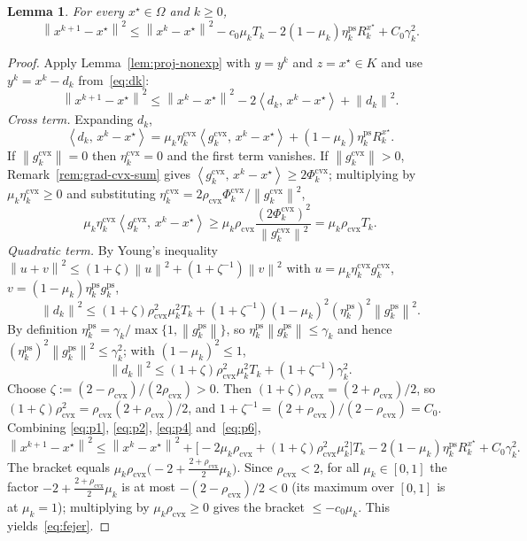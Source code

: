 \documentclass[]{interact}
\theoremstyle{plain}
\newtheorem{lemma}[theorem]{Lemma}
\theoremstyle{definition}
\theoremstyle{remark}
\newcommand{\norm}[1]{\left\lVert #1 \right\rVert}
\newcommand{\inner}[2]{\left\langle #1,\, #2 \right\rangle}
\newcommand{\cvx}{\mathrm{cvx}}
\newcommand{\ps}{\mathrm{ps}}
\begin{document}
\begin{lemma}\label{lem:fejer}
For every $x^\star\in\Omega$ and $k\ge 0$,
\begin{equation}\label{eq:fejer}
\norm{x^{k+1}-x^\star}^2\le\norm{x^k-x^\star}^2-c_0\mu_k T_k-2(1-\mu_k)\eta^{\ps}_k R^{x^\star}_k+C_0\gamma_k^2 .
\end{equation}
\end{lemma}
\begin{proof}
Apply Lemma~\ref{lem:proj-nonexp} with $y=y^k$ and $z=x^\star\in K$ and use
$y^k=x^k-d_k$ from~\eqref{eq:dk}:
\begin{equation}\label{eq:p1}
\norm{x^{k+1}-x^\star}^2\le\norm{x^k-x^\star}^2-2\inner{d_k}{x^k-x^\star}+\norm{d_k}^2 .
\end{equation}
\emph{Cross term.} Expanding $d_k$,
\begin{equation}\label{eq:p2}
\inner{d_k}{x^k-x^\star}=\mu_k\eta^{\cvx}_k\inner{g^{\cvx}_k}{x^k-x^\star}+(1-\mu_k)\eta^{\ps}_k R^{x^\star}_k .
\end{equation}
If $\norm{g^{\cvx}_k}=0$ then $\eta^{\cvx}_k=0$ and the first term vanishes. If
$\norm{g^{\cvx}_k}>0$, Remark~\ref{rem:grad-cvx-sum} gives
$\inner{g^{\cvx}_k}{x^k-x^\star}\ge 2\Phi^{\cvx}_k$; multiplying by
$\mu_k\eta^{\cvx}_k\ge 0$ and substituting
$\eta^{\cvx}_k=2\rho_{\cvx}\Phi^{\cvx}_k/\norm{g^{\cvx}_k}^2$,
\begin{equation}\label{eq:p4}
\mu_k\eta^{\cvx}_k\inner{g^{\cvx}_k}{x^k-x^\star}\ge\mu_k\rho_{\cvx}\frac{(2\Phi^{\cvx}_k)^2}{\norm{g^{\cvx}_k}^2}=\mu_k\rho_{\cvx}T_k .
\end{equation}
\emph{Quadratic term.} By Young's inequality
$\norm{u+v}^2\le(1+\zeta)\norm{u}^2+(1+\zeta^{-1})\norm{v}^2$ with
$u=\mu_k\eta^{\cvx}_k g^{\cvx}_k$, $v=(1-\mu_k)\eta^{\ps}_k g^{\ps}_k$,
\[
\norm{d_k}^2\le(1+\zeta)\rho_{\cvx}^2\mu_k^2 T_k+(1+\zeta^{-1})(1-\mu_k)^2(\eta^{\ps}_k)^2\norm{g^{\ps}_k}^2 .
\]
By definition $\eta^{\ps}_k=\gamma_k/\max\{1,\norm{g^{\ps}_k}\}$, so
$\eta^{\ps}_k\norm{g^{\ps}_k}\le\gamma_k$ and hence
$(\eta^{\ps}_k)^2\norm{g^{\ps}_k}^2\le\gamma_k^2$; with $(1-\mu_k)^2\le 1$,
\begin{equation}\label{eq:p6}
\norm{d_k}^2\le(1+\zeta)\rho_{\cvx}^2\mu_k^2 T_k+(1+\zeta^{-1})\gamma_k^2 .
\end{equation}
Choose $\zeta:=(2-\rho_{\cvx})/(2\rho_{\cvx})>0$. Then
$(1+\zeta)\rho_{\cvx}=(2+\rho_{\cvx})/2$, so
$(1+\zeta)\rho_{\cvx}^2=\rho_{\cvx}(2+\rho_{\cvx})/2$, and
$1+\zeta^{-1}=(2+\rho_{\cvx})/(2-\rho_{\cvx})=C_0$. Combining
\eqref{eq:p1}, \eqref{eq:p2}, \eqref{eq:p4} and~\eqref{eq:p6},
\[
\norm{x^{k+1}-x^\star}^2\le\norm{x^k-x^\star}^2+\bigl[-2\mu_k\rho_{\cvx}+(1+\zeta)\rho_{\cvx}^2\mu_k^2\bigr]T_k-2(1-\mu_k)\eta^{\ps}_k R^{x^\star}_k+C_0\gamma_k^2 .
\]
The bracket equals
$\mu_k\rho_{\cvx}\bigl(-2+\tfrac{2+\rho_{\cvx}}{2}\mu_k\bigr)$. Since $\rho_{\cvx}<2$, for
all $\mu_k\in[0,1]$ the factor $-2+\tfrac{2+\rho_{\cvx}}{2}\mu_k$ is at most
$-(2-\rho_{\cvx})/2<0$ (its maximum over $[0,1]$ is at $\mu_k=1$); multiplying by
$\mu_k\rho_{\cvx}\ge0$ gives the bracket $\le -c_0\mu_k$. This yields~\eqref{eq:fejer}.
\end{proof}
\end{document}
